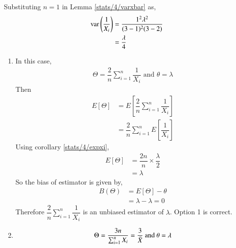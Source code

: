         \begin{corollary}
        \label{stats/4/varxi}
        Substituting $ n=1 $ in Lemma \ref{stats/4/varxbar} as,
        \begin{align}
             \text{var}\left( \dfrac{1}{X_i} \right) &= \dfrac{1^2\lambda^2}{(3-1)^2(3-2)}\\
             &= \dfrac{\lambda}{4}
        \end{align}
        \end{corollary}
        \begin{enumerate}
            \item 
In this case, 
         \begin{align}
             \Theta = \dfrac{2}{n} \sum_{i=1}^{n} \dfrac{1}{X_i} \text{  and  }
             \theta = \lambda
         \end{align}
Then 
        \begin{align}
            E[\Theta ] &= E  \left[   \dfrac{2}{n} \sum_{i=1}^{n} \dfrac{1}{X_i}  \right] \\
            & = \dfrac{2}{n} \sum_{i=1}^{n} E  \left[ \dfrac{1}{X_i}  \right] 
         \end{align}
        Using corollary \ref{stats/4/expxi},
         \begin{align}
         E[\Theta]     &= \dfrac{2n}{n} \times \dfrac{\lambda}{2} \\
                      &= \lambda
        \end{align}
        So the bias of estimator is given by,
        \begin{align}
            B(\Theta) &= E[\Theta] - \theta  \\
            &= \lambda - \lambda = 0
        \end{align}
        Therefore $\dfrac{2}{n} \sum_{i=1}^{n} \dfrac{1}{X_i} $ is an unbiased estimator of $ \lambda$.
        Option 1 is correct. 
        \item
         \begin{align}
             \Theta = \dfrac{3n}{\sum_{i=1}^{n} X_i } = \dfrac{3}{ \Bar{X}}  \text{  and  }
             \theta = \lambda
         \end{align}

\end{enumerate}

